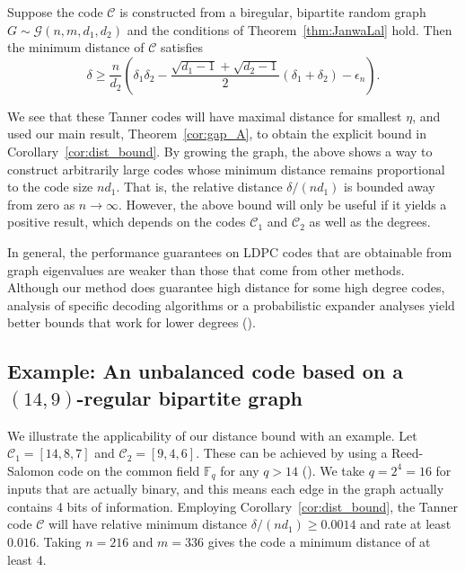 \begin{corollary}
\label{cor:dist_bound}
Suppose the code $\mathcal{C}$ is constructed from a biregular, bipartite random graph 
$G \sim \mathcal{G}(n,m, d_1, d_2)$ and the conditions of Theorem~\ref{thm:JanwaLal} hold.
Then the minimum distance of $\mathcal{C}$ satisfies
\[
\delta \geq \frac{n}{d_2} \left( \delta_1 \delta_2 - 
\frac{\sqrt{d_1 - 1} + \sqrt{d_2 - 1}}{2} (\delta_1 + \delta_2 ) - \epsilon_n \right) .
\]
\end{corollary}

We see that these Tanner codes will have maximal distance for smallest $\eta$,
and used our main result, Theorem~\ref{cor:gap_A}, to obtain the explicit
bound in Corollary~\ref{cor:dist_bound}.
By growing the graph, the above shows a way to construct arbitrarily large codes whose
minimum distance remains proportional to the code size $n d_1$.
That is, the relative distance $\delta / (n d_1)$ 
is bounded away from zero as $n \to \infty$.
However, the above bound will only be useful if it yields a positive result, 
which depends on the codes $\mathcal{C}_1$ and $\mathcal{C}_2$ as well as the degrees.

\begin{remark}
In general, the performance guarantees on LDPC codes that are obtainable 
from graph eigenvalues are weaker than those that come from other methods.
Although our method does guarantee high distance for some high degree codes, 
analysis of specific decoding algorithms or a probabilistic expander analyses
yield better bounds that work for lower degrees (\citet*{richardson2008}).
\end{remark}

\subsection{Example: An unbalanced code based on a $(14,9)$-regular bipartite graph}

We illustrate the applicability of our distance bound with an example.
Let $\mathcal{C}_1 = [14, 8, 7]$ and $\mathcal{C}_2 = [9, 4, 6]$.
These can be achieved by using a Reed-Salomon code
on the common field $\mathbb{F}_{q}$ for any $q > 14$ (\citet*{richardson2008}).
We take $q = 2^4 = 16$ for inputs that are actually binary, and
this means each edge in the graph actually contains 4 bits of information.
Employing Corollary~\ref{cor:dist_bound}, 
the Tanner code $\mathcal{C}$
will have relative minimum distance 
$\delta / (n d_1) \geq 0.0014$ and 
rate at least $0.016$.
Taking $n = 216$ and $m = 336$ gives the code a minimum distance of 
at least 4.











